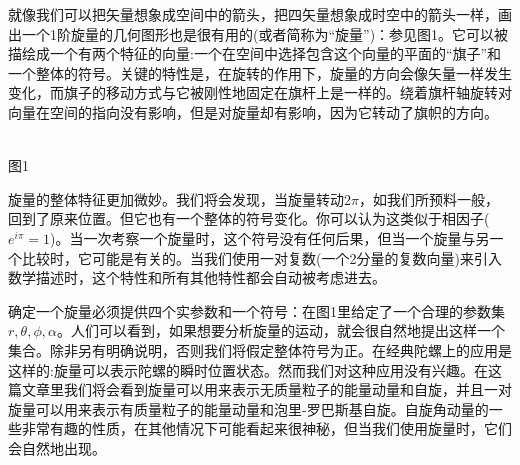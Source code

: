 \documentclass[a4paper,12pt]{article}
\begin{document}
    就像我们可以把矢量想象成空间中的箭头，把四矢量想象成时空中的箭头一样，画出一个1阶旋量的几何图形也是很有用的(或者简称为“旋量”)：参见图1。它可以被描绘成一个有两个特征的向量:一个在空间中选择包含这个向量的平面的“旗子”和一个整体的符号。关键的特性是，在旋转的作用下，旋量的方向会像矢量一样发生变化，而旗子的移动方式与它被刚性地固定在旗杆上是一样的。绕着旗杆轴旋转对向量在空间的指向没有影响，但是对旋量却有影响，因为它转动了旗帜的方向。
\begin{center}
    \\
    图1
\end{center}

    旋量的整体特征更加微妙。我们将会发现，当旋量转动$2\pi$，如我们所预料一般，回到了原来位置。但它也有一个整体的符号变化。你可以认为这类似于相因子($e^{i\pi}=1$)。当一次考察一个旋量时，这个符号没有任何后果，但当一个旋量与另一个比较时，它可能是有关的。当我们使用一对复数(一个2分量的复数向量)来引入数学描述时，这个特性和所有其他特性都会自动被考虑进去。

    确定一个旋量必须提供四个实参数和一个符号：在图1里给定了一个合理的参数集$r,\theta,\phi,\alpha$。人们可以看到，如果想要分析旋量的运动，就会很自然地提出这样一个集合。除非另有明确说明，否则我们将假定整体符号为正。在经典陀螺上的应用是这样的:旋量可以表示陀螺的瞬时位置状态。然而我们对这种应用没有兴趣。在这篇文章里我们将会看到旋量可以用来表示无质量粒子的能量动量和自旋，并且一对旋量可以用来表示有质量粒子的能量动量和泡里-罗巴斯基自旋。自旋角动量的一些非常有趣的性质，在其他情况下可能看起来很神秘，但当我们使用旋量时，它们会自然地出现。
\end{document}
